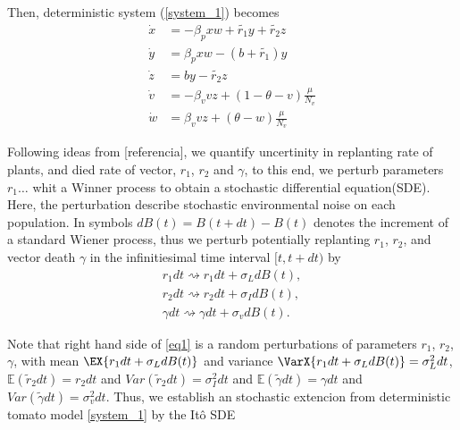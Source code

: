 Then, deterministic system (\ref{system_1}) becomes
\begin{equation}
	\begin{aligned}
		\label{system_2}
		\dot{x} &=
			-\beta_p x w + \tilde{r_1} y + \tilde{r_2} z 
		\\
		\dot{y} &=
			\beta_p x w - (b + \tilde{r_1}) y 
		\\
		\dot{z} &=
			b y - \tilde{r_2} z 
		\\
		\dot{v} &=
			-\beta_v v z  +(1-\theta-v)\frac{\mu}{N_v} 
		\\
		\dot{w} &=
			\beta_v v z + (\theta-w) \frac{\mu}{N_v}
		\end{aligned}
\end{equation}


	Following ideas from [referencia], we quantify uncertinity in replanting rate of
plants, and  died rate of vector, $r_1$, $r_2$ and $\gamma$, to this end, we
perturb parameters   $r_1 \dots$ whit a Winner
process to obtain a stochastic differential equation(SDE). Here, the 
perturbation describe stochastic environmental noise on each population. In
symbols $ dB(t)=B(t+dt)-B(t)$ denotes the increment of a standard Wiener
process, thus we perturb potentially replanting $r_1$, $r_2$, and vector death
$\gamma$ in the infinitiesimal time interval $[t, t + dt)$ by
\begin{equation}
	\label{eq1}
	\begin{aligned}
		{r}_1 dt \rightsquigarrow r_1 dt + \sigma_L dB(t),
		\\
		{r}_2 dt \rightsquigarrow r_2 dt + \sigma_Id B(t),
		\\
		\gamma dt \rightsquigarrow \gamma dt + \sigma_vd B(t).
	\end{aligned}
\end{equation}

	Note that right hand side of \eqref{eq1} is a random perturbations of parameters
$r_1$, $r_2$, $\gamma$, with mean
$
	\EX{r_1 dt + \sigma_L dB(t)}
$
and variance 
$
	\VarX{r_1 dt + \sigma_L dB(t)} = \sigma_L^2dt
$, 
$
	\mathbb{E}(\tilde{r}_2dt) = r_2dt
$ 
and
$
	Var(\tilde{r}_2dt) = \sigma_I^2dt
$ 
and 
$
	\mathbb{E}(\tilde{\gamma}dt) = \gamma dt
$ and 
$
	Var(\tilde{\gamma}dt) = \sigma_v^2dt
$.
%
Thus, we establish an stochastic extencion from deterministic tomato model 
\eqref{system_1} by the It\^{o} SDE

